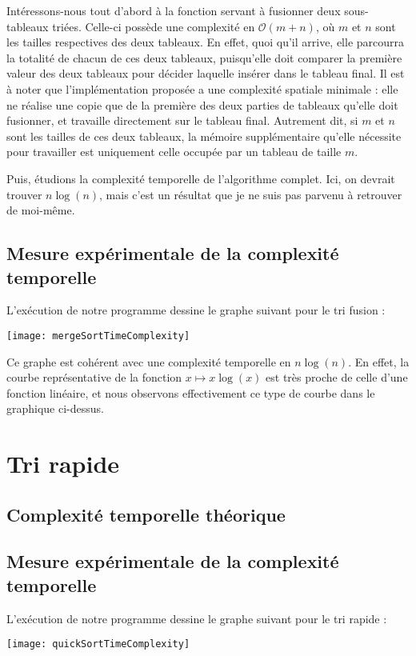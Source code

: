       Intéressons-nous tout d'abord à la fonction servant à fusionner deux sous-tableaux triées. Celle-ci
      possède une complexité en $\mathcal{O}(m + n)$, où $m$ et $n$ sont les tailles respectives des deux tableaux.
      En effet, quoi qu'il
      arrive, elle parcourra la totalité de chacun de ces deux tableaux, puisqu'elle doit comparer la première
      valeur des deux tableaux pour décider laquelle insérer dans le tableau final. Il est à noter que l'implémentation
      proposée a une complexité spatiale minimale : elle ne réalise une copie que de la première des deux parties de
      tableaux qu'elle doit fusionner, et travaille directement sur le tableau final. Autrement dit, si
      $m$ et $n$ sont les tailles
      de ces deux tableaux, la mémoire supplémentaire qu'elle nécessite pour travailler est uniquement celle occupée par
      un tableau de taille $m$.

      Puis, étudions la complexité temporelle de l'algorithme complet. Ici, on devrait trouver $n \log{}(n)$, mais c'est
      un résultat que je ne suis pas parvenu à retrouver de moi-même.

    \subsection{Mesure expérimentale de la complexité temporelle}

      L'exécution de notre programme dessine le graphe suivant pour le tri fusion :
      \begin{center}
        \texttt{[image: mergeSortTimeComplexity]}
      \end{center}

      Ce graphe est cohérent avec une complexité temporelle en $n \log{}(n)$. En effet, la courbe représentative de la
      fonction $x \mapsto x \log{}(x)$ est très proche de celle d'une fonction linéaire, et nous observons effectivement ce
      type de courbe dans le graphique ci-dessus.

    \section{Tri rapide}
      \subsection{Complexité temporelle théorique}
      \subsection{Mesure expérimentale de la complexité temporelle}
        L'exécution de notre programme dessine le graphe suivant pour le tri rapide :
        \begin{center}
          \texttt{[image: quickSortTimeComplexity]}
        \end{center}

